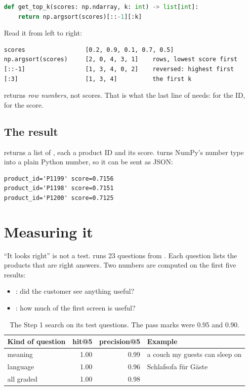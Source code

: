\documentclass[11pt]{article}
\begin{document}
\begin{lstlisting}[language=Python]
def get_top_k(scores: np.ndarray, k: int) -> list[int]:
    return np.argsort(scores)[::-1][:k]
\end{lstlisting}
Read it from left to right:
\begin{lstlisting}
scores                 [0.2, 0.9, 0.1, 0.7, 0.5]
np.argsort(scores)     [2, 0, 4, 3, 1]    rows, lowest score first
[::-1]                 [1, 3, 4, 0, 2]    reversed: highest first
[:3]                   [1, 3, 4]          the first k
\end{lstlisting}
 returns \emph{row numbers}, not scores. That is what
the last line of  needs:  for the ID,
 for the score.

\subsection{The result}

 returns a list of , each a product ID and its
score.  turns NumPy's number type into a plain Python
number, so it can be sent as JSON:
\begin{lstlisting}
product_id='P1199' score=0.7156
product_id='P1198' score=0.7151
product_id='P1200' score=0.7125
\end{lstlisting}

\section{Measuring it}
\label{sec:measure}

``It looks right'' is not a test. 
runs 23 questions from . Each
question lists the products that are right answers. Two numbers are
computed on the first five results:
\begin{itemize}[leftmargin=1.4em, itemsep=2pt]
\item {}: did the customer see anything useful?
\item {}: how much of the first screen is useful?
\end{itemize}

\begin{table}[H]
\small
\begin{tabularx}{\textwidth}{@{}X r r l@{}}
\toprule
Kind of question & hit@5 & precision@5 & Example \\
\midrule
meaning & 1.00 & 0.99 & a couch my guests can sleep on \\
language & 1.00 & 0.96 & Schlafsofa für Gäste \\
\midrule
all graded & \textcolor{accent}{1.00} & \textcolor{accent}{0.98} & \\
\bottomrule
\end{tabularx}
\caption{The Step 1 search on its test questions. The pass marks were
0.95 and 0.90.}
\end{table}
\end{document}
